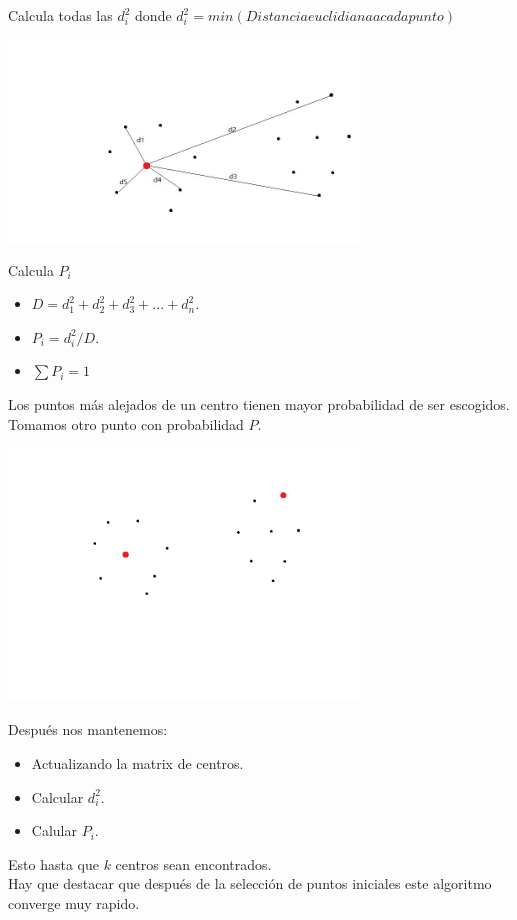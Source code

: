 \documentclass[a4paper]{article}
\begin{document}
Calcula todas las $d_{i}^{2}$ donde $d_{i}^{2}=min(Distancia euclidiana a cada punto)$
\begin{center}
\includegraphics[width=0.7\textwidth]{all_distances.png}
\end{center}
\newpage
Calcula $P_{i}$
\begin{itemize}
\item $D=d_{1}^{2}+d_{2}^{2}+d_{3}^{2}+...+d_{n}^{2}$.
\item $P_{i}=d_{i}^{2}/D$.
\item $\sum P_{i} = 1$
\end{itemize}
Los puntos m\'as alejados de un centro tienen mayor probabilidad de ser escogidos.
\\
Tomamos otro punto con probabilidad $P$.
\begin{center}
\includegraphics[width=0.7\textwidth]{tomar_otro_punto.png}
\end{center}
Despu\'es nos mantenemos:
\begin{itemize}
\item Actualizando la matrix de centros.
\item Calcular $d_{i}^{2}$.
\item Calular $P_{i}$.
\end{itemize}
Esto hasta que $k$ centros sean encontrados.
\\
Hay que destacar que despu\'es de la selecci\'on de puntos iniciales este algoritmo converge muy rapido.
\end{document}
